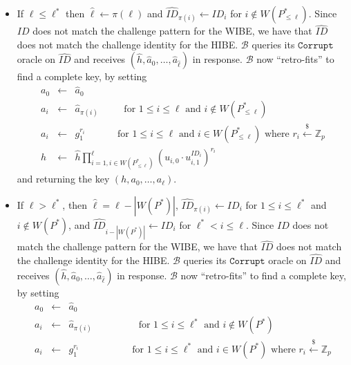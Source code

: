 \documentclass[10pt]{llncs}
\newcommand{\B}{\mathcal{B}}
\newcommand{\Zbb}{\mathbb{Z}}
\newcommand{\ID}{\mathit{ID}}
\newcommand{\getsr}{\stackrel{{\scriptscriptstyle\$}}{\gets}}
\begin{document}
\begin{enumerate}
\begin{itemize}
        \begin{itemize}
        \item If $\ell \leq \ell^{*}$ then $\hat{\ell} \gets \pi(\ell)$ and $\hat{\ID}_{\pi(i)} \gets \ID_{i}$ for $i\notin W(P^{*}_{\leq \ell})$. Since $\ID$ does not match the challenge pattern for the WIBE, we have that $\hat{\ID}$ does not match the challenge identity for the HIBE. $\B$ queries its $\texttt{Corrupt}$ oracle on $\hat{\ID}$ and receives $(\hat{h},\hat{a}_{0},\ldots,\hat{a}_{\hat{\ell}})$ in response. $\B$ now ``retro-fits'' to find a complete key, by setting
            \begin{displaymath}
            \begin{array}{rcl}
            a_{0} &\gets& \hat{a}_{0}\\
            a_{i} &\gets& \hat{a}_{\pi(i)} \qquad \;\mbox{ for }1\leq i\leq \ell \mbox{ and } i\notin W(P^{*}_{\leq \ell})\\
            a_{i} &\gets& g_{1}^{r_{i}} \qquad \quad \mbox{ for }1\leq i\leq \ell \mbox{ and } i\in W(P^{*}_{\leq \ell})\mbox{ where } r_{i}\getsr \Zbb_{p}\\
            h &\gets& \hat{h} \prod_{i=1, i\in W(P^{*}_{\leq \ell})}^{\ell} (u_{i,0} \cdot u_{i,1}^{\ID_{i}})^{r_{i}}
            \end{array}
            \end{displaymath}
            and returning the key $(h,a_{0},\ldots,a_{\ell})$.
        \item If $\ell > \ell^{*}$, then $\hat{\ell} = \ell - |W(P^{*})|$, $\hat{\ID}_{\pi(i)} \gets \ID_{i}$ for $1\leq i\leq \ell^{*}$ and $i\notin W(P^{*})$, and $\hat{\ID}_{i-|W(P^{*})|} \gets \ID_{i}$ for $\ell^{*} < i\leq \ell$. Since $\ID$ does not match the challenge pattern for the WIBE, we have that $\hat{\ID}$ does not match the challenge identity for the HIBE. $\B$ queries its $\texttt{Corrupt}$ oracle on $\hat{\ID}$ and receives $(\hat{h},\hat{a}_{0},\ldots,\hat{a}_{\hat{\ell}})$ in response. $\B$ now ``retro-fits'' to find a complete key, by setting
            \begin{displaymath}
            \begin{array}{rcl}
            a_{0} &\gets& \hat{a}_{0}\\
            a_{i} &\gets& \hat{a}_{\pi(i)} \qquad \qquad \; \,\mbox{ for }1\leq i\leq \ell^{*} \mbox{ and } i\notin W(P^{*})\\
            a_{i} &\gets& g_{1}^{r_{i}} \qquad \qquad \quad \, \mbox{ for }1\leq i\leq \ell^{*} \mbox{ and } i\in W(P^{*})\mbox{ where } r_{i}\getsr \Zbb_{p}\\

\end{array}
\end{displaymath}
\end{itemize}
\end{itemize}
\end{enumerate}
\end{document}
